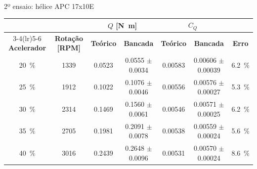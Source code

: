 \begin{frame}{2º ensaio: hélice APC 17x10E}
  \centering
  \begin{fundobranco}
  \begin{tabular}{ccccccc}
    \toprule
    & & \multicolumn{2}{c}{\textbf{$Q$ [\si{\newton\meter}]}} & \multicolumn{2}{c}{\textbf{$C_Q$}} & \\
    \cmidrule(lr){3-4}\cmidrule(lr){5-6}
    \textbf{Acelerador} & \textbf{Rotação [RPM]} & \textbf{Teórico} & \textbf{Bancada} & \textbf{Teórico} & \textbf{Bancada} & \textbf{Erro} \\
    \midrule
    \SI{20}{\percent} & \num{1339} & \num{0,0523} & \num{0,0555} $\pm$ \num{0,0034} & \num{0,00583} & \num{0,00606} $\pm$ \num{0,00039} & \SI{+6,2}{\percent} \\
    \SI{25}{\percent} & \num{1912} & \num{0,1022} & \num{0,1076} $\pm$ \num{0,0046} & \num{0,00556} & \num{0,00576} $\pm$ \num{0,00027} & \SI{+5,3}{\percent} \\
    \SI{30}{\percent} & \num{2314} & \num{0,1469} & \num{0,1560} $\pm$ \num{0,0061} & \num{0,00546} & \num{0,00571} $\pm$ \num{0,00025} & \SI{+6,2}{\percent} \\
    \SI{35}{\percent} & \num{2705} & \num{0,1981} & \num{0,2091} $\pm$ \num{0,0078} & \num{0,00538} & \num{0,00559} $\pm$ \num{0,00024} & \SI{+5,6}{\percent} \\
    \SI{40}{\percent} & \num{3016} & \num{0,2439} & \num{0,2648} $\pm$ \num{0,0096} & \num{0,00531} & \num{0,00570} $\pm$ \num{0,00024} & \SI{+8,6}{\percent} \\
    \bottomrule
  \end{tabular}
  \end{fundobranco}
\end{frame}

